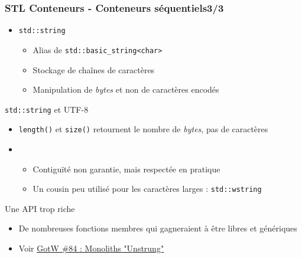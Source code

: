 \documentclass[C++.tex]{subfiles}
\begin{document}
\begin{frame}
	\frametitle{STL Conteneurs - Conteneurs séquentiels\titlehfill{}3/3}
	\begin{itemize}
		\item \lstinline|std::string|
		\begin{itemize}
			\item Alias de \lstinline|std::basic_string<char>|
			\item Stockage de chaînes de caractères
			\item Manipulation de \og \textit{bytes}\fg{} et non de caractères encodés
		\end{itemize}
	\end{itemize}

	\begin{alertblock}{\lstinline|std::string| et UTF-8}
		\begin{itemize}
			\item \lstinline|length()| et \lstinline|size()| retournent le nombre de \textit{bytes}, pas de caractères
		\end{itemize}
	\end{alertblock}

	\begin{itemize}
		\item [] \begin{itemize}
			\item Contiguïté non garantie, mais respectée en pratique


			\item Un cousin peu utilisé pour les caractères larges : \lstinline|std::wstring|
		\end{itemize}
	\end{itemize}

	\begin{alertblock}{Une API trop riche}
		\begin{itemize}
			\item De nombreuses fonctions membres qui gagneraient à être libres et génériques
			\item Voir \href{http://www.gotw.ca/gotw/084.htm}{GotW \#84 : Monoliths "Unstrung"}
		\end{itemize}
	\end{alertblock}
\end{frame}
\end{document}
